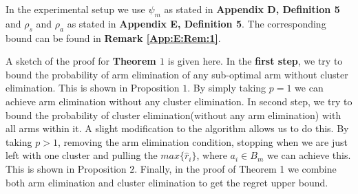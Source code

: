 \begin{remark}
\label{Result:Rem:8}
In the experimental setup we use $\psi_{m}$ as stated in \textbf{Appendix D, Definition 5} and $\rho_{s}$ and $\rho_{a}$ as stated in \textbf{Appendix E, Definition 5}. The corresponding bound can be found in \textbf{Remark \ref{App:E:Rem:1}}.
\end{remark}

\begin{remark}
\label{Result:Rem:9}
A sketch of the proof for \textbf{Theorem $1$} is given here. In the \textbf{first step}, we try to bound the probability of arm elimination of any sub-optimal arm without cluster elimination. This is shown in Proposition $1$. By simply taking $p=1$ we can achieve arm elimination without any cluster elimination. In second step, we try to bound the probability of cluster elimination(without any arm elimination) with all arms within it.  A slight modification to the algorithm allows us to do this. By taking $p>1$, removing the arm elimination condition, stopping when we are just left with one cluster and pulling the $max\lbrace \hat{r}_{i}\rbrace$, where $a_{i}\in B_{m}$ we can achieve this.  This is shown in Proposition $2$. Finally, in the proof of Theorem 1 we combine both arm elimination and cluster elimination to get the regret upper bound.  
\end{remark}
	



